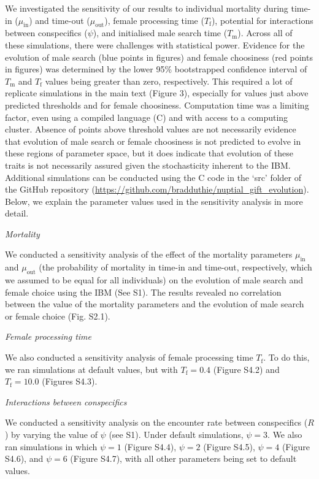 \documentclass[
]{article}
\begin{document}
We investigated the sensitivity of our results to individual mortality
during time-in (\(\mu_{\mathrm{in}}\)) and time-out
(\(\mu_{\mathrm{out}}\)), female processing time (\(T_{\mathrm{f}}\)),
potential for interactions between conspecifics (\(\psi\)), and
initialised male search time (\(T_{\mathrm{m}}\)). Across all of these
simulations, there were challenges with statistical power. Evidence for
the evolution of male search (blue points in figures) and female
choosiness (red points in figures) was determined by the lower 95\%
bootstrapped confidence interval of \(T_{\mathrm{m}}\) and
\(T_{\mathrm{f}}\) values being greater than zero, respectively. This
required a lot of replicate simulations in the main text (Figure 3),
especially for values just above predicted thresholds and for female
choosiness. Computation time was a limiting factor, even using a
compiled language (C) and with access to a computing cluster. Absence of
points above threshold values are not necessarily evidence that
evolution of male search or female choosiness is not predicted to evolve
in these regions of parameter space, but it does indicate that evolution
of these traits is not necessarily assured given the stochasticity
inherent to the IBM. Additional simulations can be conducted using the C
code in the `src' folder of the GitHub repository
(\url{https://github.com/bradduthie/nuptial_gift_evolution}). Below, we
explain the parameter values used in the sensitivity analysis in more
detail.

\emph{Mortality}

We conducted a sensitivity analysis of the effect of the mortality
parameters \(\mu_{\mathrm{in}}\) and \(\mu_{\mathrm{out}}\) (the
probability of mortality in time-in and time-out, respectively, which we
assumed to be equal for all individuals) on the evolution of male search
and female choice using the IBM (See S1). The results revealed no
correlation between the value of the mortality parameters and the
evolution of male search or female choice (Fig. S2.1).

\emph{Female processing time}

We also conducted a sensitivity analysis of female processing time
\(T_{\mathrm{f}}\). To do this, we ran simulations at default values,
but with \(T_{\mathrm{f}} = 0.4\) (Figure S4.2) and
\(T_{\mathrm{f}} = 10.0\) (Figures S4.3).

\emph{Interactions between conspecifics}

We conducted a sensitivity analysis on the encounter rate between
conspecifics (\(R\)) by varying the value of \(\psi\) (see S1). Under
default simulations, \(\psi = 3\). We also ran simulations in which
\(\psi = 1\) (Figure S4.4), \(\psi = 2\) (Figure S4.5), \(\psi = 4\)
(Figure S4.6), and \(\psi = 6\) (Figure S4.7), with all other parameters
being set to default values.
\end{document}
